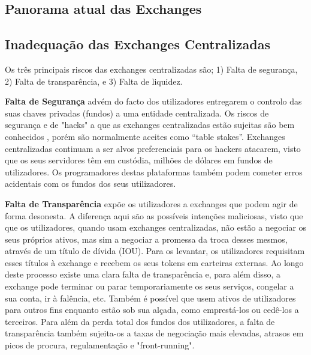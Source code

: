 \documentclass[UTF8,nofonts]{article}
\begin{document}
\begin{multicols}{2}
\section{Panorama atual das Exchanges\label{sec:current_exchange_landscape}}

\subsection{Inadequação das Exchanges Centralizadas}
Os três principais riscos das exchanges centralizadas são; 1) Falta de segurança, 2) Falta de transparência, e 3) Falta de liquidez.

\textbf{Falta de Segurança} advém do facto dos utilizadores entregarem o controlo das suas chaves privadas (fundos) a uma entidade centralizada. Os riscos de segurança e de "hacks" a que as exchanges centralizadas estão sujeitas são bem conhecidos \cite{coincheckhack}  \cite{mcmillan2014inside}, porém são normalmente aceites como \enquote{table stakes}. Exchanges centralizadas continuam a ser alvos preferenciais para os hackers atacarem, visto que os seus servidores têm em custódia, milhões de dólares em fundos de utilizadores. Os programadores destas plataformas também podem cometer erros acidentais com os fundos dos seus utilizadores.

\textbf{Falta de Transparência} expõe os utilizadores a exchanges que podem agir de forma desonesta. A diferença aqui são as possíveis intenções maliciosas, visto que que os utilizadores, quando usam exchanges centralizadas, não estão a negociar os seus próprios ativos, mas sim a negociar a promessa da troca desses mesmos, através de um título de dívida (IOU). Para os levantar, os utilizadores requisitam esses títulos à exchange e recebem os seus tokens em carteiras externas. Ao longo deste processo existe uma clara falta de transparência e, para além disso, a exchange pode terminar ou parar temporariamente os seus serviços, congelar a sua conta, ir à falência, etc. Também é possível que usem ativos de utilizadores para outros fins enquanto estão sob sua alçada, como emprestá-los ou cedê-los a terceiros. Para além da perda total dos fundos dos utilizadores, a falta de transparência também sujeita-os a taxas de negociação mais elevadas, atrasos em picos de procura, regulamentação e "front-running".


\end{multicols}
\end{document}
